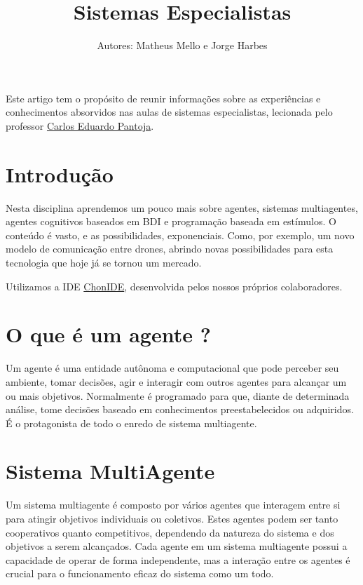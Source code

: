 \documentclass[12pt]{article}
\title{Sistemas Especialistas}
\author{Autores: Matheus Mello e Jorge Harbes\inst{1}}
\begin{document}
 
	
	\maketitle
	
	\begin{resumo} 
		Este artigo tem o propósito de reunir informações sobre as experiências e conhecimentos absorvidos nas aulas de sistemas especialistas, lecionada pelo professor \href{https://turing.pro.br/kadupantoja/}{Carlos Eduardo Pantoja}.
	\end{resumo}
	
	\section{Introdução}
	\label{sec:introducao}
		
    Nesta disciplina aprendemos um pouco mais sobre agentes, sistemas multiagentes, agentes cognitivos baseados em BDI e programação baseada em estímulos. O conteúdo é vasto, e as possibilidades, exponenciais. Como, por exemplo, um novo modelo de comunicação entre drones, abrindo novas possibilidades para esta tecnologia que hoje já se tornou um mercado.
    
    Utilizamos a IDE \href{https://github.com/chon-group/chonIDE}{ChonIDE}, desenvolvida pelos nossos próprios colaboradores.
	
	\section{O que é um agente ?}
	\label{sec:agente}
	
	Um agente é uma entidade autônoma e computacional que pode perceber seu ambiente, tomar decisões, agir e interagir com outros agentes para alcançar um ou mais objetivos. Normalmente é programado para que, diante de determinada análise, tome decisões baseado em conhecimentos preestabelecidos ou adquiridos. É o protagonista de todo o enredo de sistema multiagente.
	
	\section{Sistema MultiAgente}
	\label{sec:sis_multiagente}

    Um sistema multiagente é composto por vários agentes que interagem entre si para atingir objetivos individuais ou coletivos. Estes agentes podem ser tanto cooperativos quanto competitivos, dependendo da natureza do sistema e dos objetivos a serem alcançados. Cada agente em um sistema multiagente possui a capacidade de operar de forma independente, mas a interação entre os agentes é crucial para o funcionamento eficaz do sistema como um todo.
	
\end{document}
